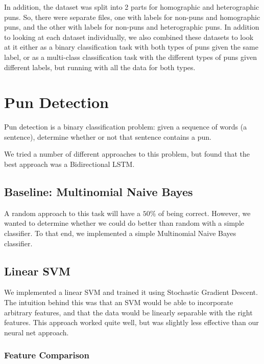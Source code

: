 \documentclass{article}
\begin{document}
In addition, the dataset was split into 2 parts for homographic and heterographic puns. So, there were separate files, one with labels for non-puns and homographic puns, and the other with  labels for non-puns and heterographic puns. In addition to looking at each dataset individually, we also combined these datasets to look at it either as a binary classification task with both types of puns given the same label, or as a multi-class classification task with the different types of puns given different labels, but running with all the data for both types.


\section{Pun Detection}\label{pun_detection}

Pun detection is a binary classification problem: given a sequence of words (a
sentence), determine whether or not that sentence contains a pun. 

We tried a number of different approaches to this problem, but found that the
best approach was a Bidirectional LSTM.

\subsection{Baseline: Multinomial Naive Bayes}

A random approach to this task will have a $50\%$ of being correct.
However, we wanted to determine whether we could do better than random with a
simple classifier. To that end, we implemented a simple Multinomial Naive Bayes
classifier. 

\subsection{Linear SVM}

We implemented a linear SVM and trained it using Stochastic Gradient Descent.
The intuition behind this was that an SVM would be able to incorporate arbitrary
features, and that the data would be linearly separable with the right features.
This approach worked quite well, but was slightly less effective than our neural
net approach.

\subsubsection{Feature Comparison}
\end{document}
